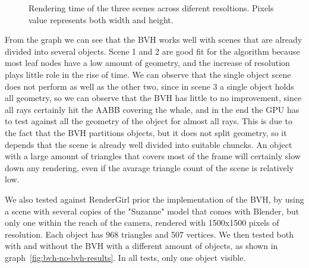 \documentclass{vgtc}
\begin{document}
\begin{figure}
\centering
{}
\caption{Rendering time of the three scenes across diferent
  resoltions. Pixels value represents both width and height.}
\label{fig:scenes-results}
\end{figure}

From the graph we can see that the BVH works well with scenes that are
already divided into several objects. Scene 1 and 2 are good fit for
the algorithm because most leaf nodes have a low amount of geometry,
and the increase of resolution plays little role in the rise of
time. We can observe that the single object scene does not perform as
well as the other two, since in scene 3 a single object holds all
geometry, so we can observe that the BVH has little to no improvement,
since all rays certainly hit the AABB covering the whale, and in the
end the GPU has to test against all the geometry of the object for
almost all rays. This is due to the fact that the BVH partitions
objects, but it does not split geometry, so it depends that the scene
is already well divided into suitable chuncks. An object with a large
amount of triangles that covers most of the frame will certainly slow
down any rendering, even if the avarage triangle count of the scene is
relatively low.

We also tested against RenderGirl prior the implementation of the BVH,
by using a scene with several copies of the "Suzanne" model that comes
with Blender, but only one within the reach of the camera, rendered
with 1500x1500 pixels of resolution. Each object has 968 triangles and
507 vertices. We then tested both with and without the BVH with a
different amount of objects, as shown in
graph~\ref{fig:bvh-no-bvh-results}. In all tests, only one object
visible.
\end{document}
